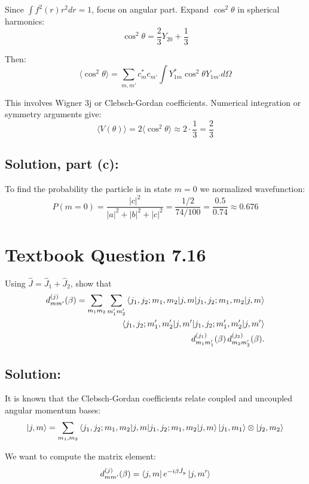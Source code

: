 \documentclass[12pt]{article}
\begin{document}
        Since \( \int f^2(r) r^2 dr = 1 \), focus on angular part. Expand \( \cos^2 \theta \) in spherical harmonics:
        \[
            \cos^2 \theta = \frac{2}{3} Y_{20} + \frac{1}{3}
        \]

        Then:
        \[
            \langle \cos^2 \theta \rangle = \sum_{m,m'} c_m^* c_{m'} \int Y_{1m}^* \cos^2 \theta Y_{1m'} d\Omega
        \]

        This involves Wigner 3j or Clebsch-Gordan coefficients. Numerical integration or symmetry arguments give:
        \[
            \langle V(\theta) \rangle = 2 \langle \cos^2 \theta \rangle \approx 2 \cdot \frac{1}{3} = \frac{2}{3}
        \]

    \subsection{Solution, part (c):}
        To find the probability the particle is in state \( m = 0 \) we normalized wavefunction:
        \[
            P(m = 0) = \frac{|c|^2}{|a|^2 + |b|^2 + |c|^2} = \frac{1/2}{74/100} = \frac{0.5}{0.74} \approx 0.676
        \]


\section{Textbook Question 7.16}
    Using \( \hat{J} = \hat{J}_1 + \hat{J}_2 \), show that
    \begin{equation}
        \begin{split}
            d^{(j)}_{mm'}(\beta) = 
            \sum_{m_1 m_2} \sum_{m_1' m_2'} 
            \braket{j_1, j_2; m_1, m_2 | j, m} \\
            \braket{j_1, j_2; m_1', m_2' | j, m'}  \\
            \, d^{(j_1)}_{m_1 m_1'}(\beta)
            \, d^{(j_2)}_{m_2 m_2'}(\beta).
        \end{split}
    \end{equation}

    \subsection{Solution:}
        It is known that the Clebsch-Gordan coefficients relate coupled and uncoupled angular momentum bases:
        \[
            \ket{j, m} = \sum_{m_1, m_2} \braket{j_1, j_2; m_1, m_2 | j, m} \ket{j_1, m_1} \otimes \ket{j_2, m_2}
        \]

        We want to compute the matrix element:
        \[
            d^{(j)}_{mm'}(\beta) = \bra{j, m} e^{-i \beta \hat{J}_y} \ket{j, m'}
        \]
\end{document}
